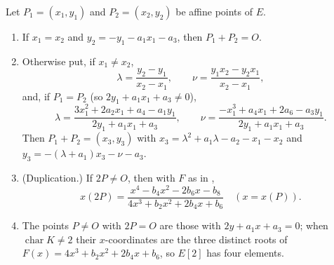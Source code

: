 \begin{proposition}\label{prop:ellcurves:addition}
Let $P_1=(x_1,y_1)$ and $P_2=(x_2,y_2)$ be affine points of $E$.
\begin{enumerate}[label=(\roman*)]
\item If $x_1=x_2$ and $y_2=-y_1-a_1x_1-a_3$, then $P_1+P_2=O$.
\item Otherwise put, if $x_1\ne x_2$,
\[
\lambda=\frac{y_2-y_1}{x_2-x_1},\qquad\nu=\frac{y_1x_2-y_2x_1}{x_2-x_1},
\]
and, if $P_1=P_2$ (so $2y_1+a_1x_1+a_3\ne0$),
\[
\lambda=\frac{3x_1^2+2a_2x_1+a_4-a_1y_1}{2y_1+a_1x_1+a_3},\qquad\nu=\frac{-x_1^3+a_4x_1+2a_6-a_3y_1}{2y_1+a_1x_1+a_3}.
\]
Then $P_1+P_2=(x_3,y_3)$ with $x_3=\lambda^2+a_1\lambda-a_2-x_1-x_2$ and $y_3=-(\lambda+a_1)x_3-\nu-a_3$.
\item (Duplication.) If $2P\ne O$, then with $F$ as in ,
\[
x(2P)=\frac{x^4-b_4x^2-2b_6x-b_8}{4x^3+b_2x^2+2b_4x+b_6}\quad(x=x(P)).
\]
\item The points $P\ne O$ with $2P=O$ are those with $2y+a_1x+a_3=0$; when $\operatorname{char}K\ne2$ their $x$-coordinates are the three distinct roots of
$F(x)=4x^3+b_2x^2+2b_4x+b_6$, so $E[2]$ has four elements.
\end{enumerate}
\end{proposition}

